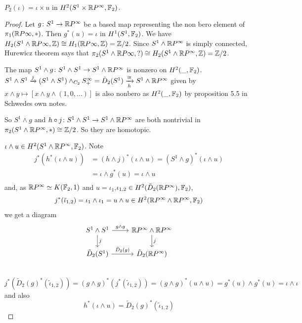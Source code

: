\documentclass[language=english]{TemplateLecture}
\begin{document}
\begin{proposition}
    \(P_2(\iota) = \iota\times u \) in \(H^2(S^1\times \mathbb{R} P^\infty, \mathbb{F}_2)\).
\end{proposition}

\begin{proof}
    Let \(g\colon S^1 \to \mathbb{R} P^\infty\) be a based map representing the non bero element of \(\pi_1(\mathbb{R} P\infty, *)\). Then \(g^*(u) = \iota\) in \(H^1(S^1, \mathbb{F}_2)\). We have \(H_2(S^1 \wedge \mathbb{R} P\infty, \mathbb{Z}) \cong H_1(\mathbb{R} P\infty, \mathbb{Z}) = \mathbb{Z}/2\). Since \(S^1\wedge \mathbb{R} P^\infty\) is simply connected, Hurewicz theorem says that \(\pi_2(S^1 \wedge \mathbb{R} P\infty, ?) \cong H_2(S^1 \wedge \mathbb{R} P^\infty, \mathbb{Z}) = \mathbb{Z}/2\).

    The map \(S^1 \wedge g\colon S^1\wedge S^1 \to S^1 \wedge \mathbb{R} P^\infty\) is nonzero on \(H^2(\_, \mathbb{F}_2)\). \(S^1 \wedge S^1 \xrightarrow{j} (S^1 \wedge S^1)\wedge _{C_2}S^\infty_+ = \tilde D_2(S^1) \xrightarrow[h]{\cong} S^1 \wedge \mathbb{R} P^\infty\) given by \(x\wedge y \mapsto [x\wedge y\wedge (1, 0,\dots)]\) is also nonbero as \(H^2(\_, \mathbb{F}_2)\) by proposition 5.5 in Schwedes own notes.

    So \(S^1\wedge g\) and \(h\circ j\colon S^1 \wedge S^1\to S^1 \wedge \mathbb{R} P^\infty\) are both nontrivial in \(\pi_2(S^1 \wedge \mathbb{R} P^\infty,*) \cong \mathbb{Z} /2\). So they are homotopic.

    \(\iota\wedge u \in H^2(S^1 \wedge \mathbb{R} P^\infty, \mathbb{F}_2)\). Note
    \[\begin{split}
        j^*(h^*(\iota\wedge u)) &= (h\wedge j)^*(\iota\wedge u) = (S^1 \wedge g)^*(\iota\wedge u) \\
        &= \iota\wedge g^*(u) = \iota\wedge u \\
    \end{split}\]
    and, as \(\mathbb{R} P^\infty \simeq K(\mathbb{F}_2, 1)\) and \(u = \iota_1\),\(\iota_{1,2}\in H^2(\tilde D_2(\mathbb{R} P^\infty), \mathbb{F}_2)\),
    \[\begin{split}
        j^*(\tilde \iota_{1,2}) = \iota_1 \wedge \iota_1 = u\wedge u \in H^2(\mathbb{R} P^\infty\wedge \mathbb{R} P^\infty, \mathbb{F}_2)\\
    \end{split}\]
    we get a diagram
    \[\begin{tikzcd}
        S^1 \wedge S^1 \ar[d, "j"] \ar[r, "g\wedge g"] & \ir P^\infty \wedge \ir P^\infty \ar[d, "j"] \\
        \tilde D_2(S^1) \ar[r, "\tilde D_2(g)"] & \tilde D_2(\ir P^\infty) \\
    \end{tikzcd}\]
    \[j^*(\tilde D_2(g)^*(\tilde \iota_{1,2})) = (g\wedge g)^*(j^*(\tilde \iota_{1,2})) = (g\wedge g)^*(u\wedge u) = g^*(u)\wedge g^*(u) = \iota\wedge \iota\]
    and also
    \[h^*(\iota\wedge u) = \tilde D_2(g)^*(\tilde \iota_{1,2})\]


\end{proof}
\end{document}
